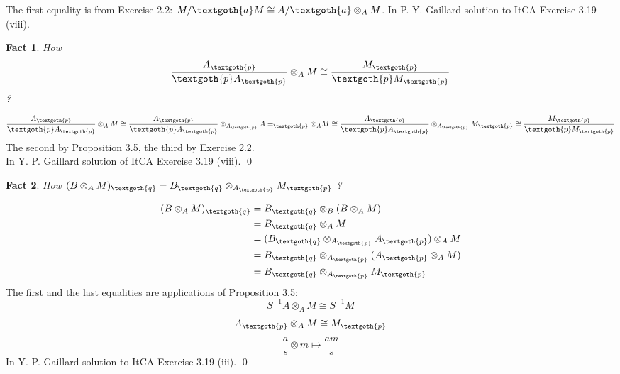 \documentclass{article}
\newtheorem{theorem}{Fact}[section]
\begin{document}
\noindent
The first equality is from Exercise 2.2: $M/\textgoth{a}M \cong 
A/\textgoth{a} \otimes_A M$. 
In P. Y. Gaillard solution to ItCA Exercise 3.19 (viii).

\bigskip
\begin{theorem}
How
\[
\frac{A_\textgoth{p}}{\textgoth{p} A_\textgoth{p}} \otimes_A M 
\cong
\frac{M_\textgoth{p}}{\textgoth{p} M_\textgoth{p}}
\]
?
\end{theorem}

\begin{gather*}
\frac{A_\textgoth{p}}{\textgoth{p} A_\textgoth{p}} \otimes_A M 
\cong 
\frac{A_\textgoth{p}}{\textgoth{p} A_\textgoth{p}} \otimes_{A_\textgoth{p}} A=_\textgoth{p} \otimes_A M 
\cong
\frac{A_\textgoth{p}}{\textgoth{p} A_\textgoth{p}} \otimes_{A_\textgoth{p}} M_\textgoth{p} 
\cong
\frac{M_\textgoth{p}}{\textgoth{p} M_\textgoth{p}}
\end{gather*}
\noindent
The second by Proposition 3.5, the third by Exercise 2.2. \\
In Y. P. Gaillard solution of ItCA Exercise 3.19 (viii).
\qed

\bigskip
\begin{theorem}
How $(B \otimes_A M)_\textgoth{q} = B_\textgoth{q} \otimes_{A_\textgoth{p}} M_\textgoth{p}$ ?
\end{theorem}

\noindent
\begin{equation*}
\begin{split}
(B \otimes_A M)_\textgoth{q} & = B_\textgoth{q} \otimes_B (B \otimes_A M) \\
                             & = B_\textgoth{q} \otimes_A M \\
                             & = (B_\textgoth{q} \otimes_{A_\textgoth{p}} A_\textgoth{p}) \otimes_A M \\
                             & = B_\textgoth{q} \otimes_{A_\textgoth{p}} (A_\textgoth{p} \otimes_A M) \\
                             & = B_\textgoth{q} \otimes_{A_\textgoth{p}} M_\textgoth{p}
\end{split}
\end{equation*}
\noindent
The first and the last equalities are applications of Proposition 3.5:
\[
  S^{-1}A \otimes_A M \cong S^{-1}M
\]
\[
  A_\textgoth{p} \otimes_A M \cong M_\textgoth{p}
\]
\[
\frac{a}{s} \otimes m \mapsto \frac{am}{s}
\]
In Y. P. Gaillard solution to ItCA Exercise 3.19 (iii).
\qed
\end{document}
